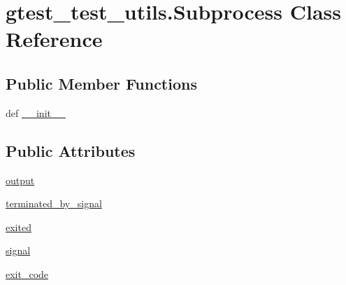 \hypertarget{classgtest__test__utils_1_1_subprocess}{\section{gtest\-\_\-test\-\_\-utils.\-Subprocess Class Reference}
\label{classgtest__test__utils_1_1_subprocess}
}
\subsection*{Public Member Functions}
\begin{DoxyCompactItemize}
\item 
def \hyperlink{classgtest__test__utils_1_1_subprocess_af9df76a6fe0bb7bbf4988c22bb79ed36}{\-\_\-\-\_\-init\-\_\-\-\_\-}
\end{DoxyCompactItemize}
\subsection*{Public Attributes}
\begin{DoxyCompactItemize}
\item 
\hyperlink{classgtest__test__utils_1_1_subprocess_a170f722b867e51f3e97b5b60399988cf}{output}
\item 
\hyperlink{classgtest__test__utils_1_1_subprocess_a9654b9eddd43c93acf66d5c7b0026fca}{terminated\-\_\-by\-\_\-signal}
\item 
\hyperlink{classgtest__test__utils_1_1_subprocess_a020b5fa8268b9eaf1c4a57cbd53c104d}{exited}
\item 
\hyperlink{classgtest__test__utils_1_1_subprocess_af083cd9621a5d5346ffe800191678ea3}{signal}
\item 
\hyperlink{classgtest__test__utils_1_1_subprocess_a01acee4476fd01ccf017d1351cf46c08}{exit\-\_\-code}
\end{DoxyCompactItemize}


